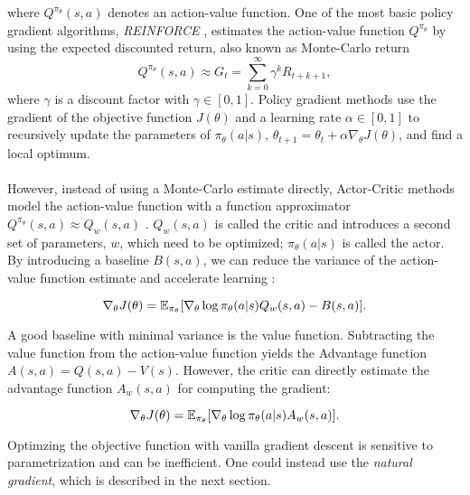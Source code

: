 where $Q^{\pi_{\theta}}(s, a)$ denotes an action-value function. One of the most basic policy gradient algorithms, \textit{REINFORCE} \citep{williams1992simple}, estimates the action-value function $Q^{\pi_{\theta}}$ by using the expected discounted return, also known as Monte-Carlo return
	\begin{equation}
	\label{equ:reinforce}
	Q^{\pi_\theta}(s, a) \approx \mathit{G}_t = \sum_{k=0}^{\infty}\gamma^k R_{t+k+1},
	\end{equation}
where $\gamma$ is a discount factor with $\gamma \in [0, 1]$. Policy gradient methods use the gradient of the objective function $J(\theta)$ and a learning rate $\alpha \in \left[0,1\right]$ to recursively update the parameters of $\pi_{\theta}(a|s)$, $\theta_{t+1} = \theta_t + \alpha \nabla_{\theta} J(\theta)$, and find a local optimum. 
\\\\
However, instead of using a Monte-Carlo estimate directly, Actor-Critic methods model the action-value function with a function approximator $Q^{\pi_\theta}(s, a) \approx Q_w(s,a)$ \citep{sutton2000policy}. $Q_w(s,a)$ is called the critic and introduces a second set of parameters, $w$, which need to be optimized; $\pi_{\theta}(a|s)$ is called the actor. By introducing a baseline $B(s,a)$, we can reduce the variance of the action-value function estimate and accelerate learning \citep{sutton2018reinforcement}:

\begin{equation}
\label{equ:policybaseline}
\nabla_{\theta}J(\theta)=\operatorname{\mathbb{E}}_{\pi_{\theta}}[\nabla_{\theta}\log\pi_{\theta}(a|s) Q_w(s, a) - B(s,a)].
\end{equation}

A good baseline with minimal variance is the value function. Subtracting the value function from the action-value function yields the Advantage function $A(s,a) = Q(s,a)-V(s)$. However, the critic can directly estimate the advantage function $A_w(s,a)$ for computing the gradient:

\begin{equation}
	\nabla_{\theta}J(\theta)=\operatorname{\mathbb{E}}_{\pi_{\theta}}[\nabla_{\theta}\log\pi_{\theta}(a|s) A_w(s, a)].
\end{equation}

Optimzing the objective function with vanilla gradient descent is sensitive to parametrization and can be inefficient. One could instead use the \textit{natural gradient}, which is described in the next section.

